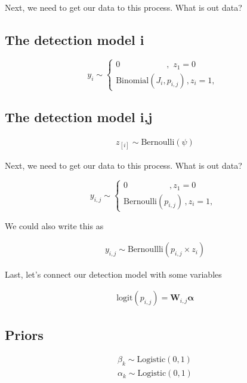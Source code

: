 \documentclass[12pt]{article}
\begin{document}
Next, we need to get our data to this process. What is out data?

\subsection{The detection model i}

\[y_{i}\sim
	\begin{cases}
	0\hspace{67pt}, \hspace{4pt}z_1=0\\
	\text{Binomial}(J_{i}, p_{i,j}) \hspace{1pt}, z_i=1, \hspace{3pt}
	\end{cases}\
\]


\subsection{The detection model i,j}

\begin{align*}
z_{[i]} \sim \text{Bernoulli}(\psi)
\end{align*}

Next, we need to get our data to this process. What is out data?

\[y_{i,j}\sim
	\begin{cases}
	0\hspace{60pt}, z_1=0\\
	\text{Bernoulli}(p_{i,j}) \hspace{2pt}, z_i=1, \hspace{2pt}
	\end{cases}\
\]

We could also write this as 

\begin{align*}
y_{i,j}\sim \text{Bernoullli}(p_{i,j} \times z_{i})
\end{align*}

Last, let's connect our detection model with some variables

\begin{align*}
\text{logit}(p_{i,j}) = \textbf{W}_{i,j}\boldsymbol{\alpha}
\end{align*}

\subsection{Priors}

\begin{align*}
\beta_{k} \sim \text{Logistic}(0,1)\\
\alpha_{k} \sim \text{Logistic}(0,1)\\
\end{align*}
\end{document}
